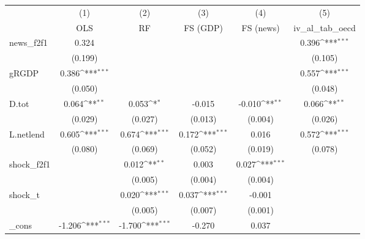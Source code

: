 {
\def\sym#1{\ifmmode^{#1}\else\(^{#1}\)\fi}
\begin{tabular}{l*{5}{c}}
\toprule
            &\multicolumn{1}{c}{(1)}&\multicolumn{1}{c}{(2)}&\multicolumn{1}{c}{(3)}&\multicolumn{1}{c}{(4)}&\multicolumn{1}{c}{(5)}\\
            &\multicolumn{1}{c}{OLS}&\multicolumn{1}{c}{RF}&\multicolumn{1}{c}{FS (GDP)}&\multicolumn{1}{c}{FS (news)}&\multicolumn{1}{c}{iv\_al\_tab\_oecd}\\
\midrule
news\_f2f1   &       0.324         &                     &                     &                     &       0.396\sym{***}\\
            &     (0.199)         &                     &                     &                     &     (0.105)         \\
\addlinespace
gRGDP       &       0.386\sym{***}&                     &                     &                     &       0.557\sym{***}\\
            &     (0.050)         &                     &                     &                     &     (0.048)         \\
\addlinespace
D.tot       &       0.064\sym{**} &       0.053\sym{*}  &      -0.015         &      -0.010\sym{**} &       0.066\sym{**} \\
            &     (0.029)         &     (0.027)         &     (0.013)         &     (0.004)         &     (0.026)         \\
\addlinespace
L.netlend   &       0.605\sym{***}&       0.674\sym{***}&       0.172\sym{***}&       0.016         &       0.572\sym{***}\\
            &     (0.080)         &     (0.069)         &     (0.052)         &     (0.019)         &     (0.078)         \\
\addlinespace
shock\_f2f1  &                     &       0.012\sym{**} &       0.003         &       0.027\sym{***}&                     \\
            &                     &     (0.005)         &     (0.004)         &     (0.004)         &                     \\
\addlinespace
shock\_t     &                     &       0.020\sym{***}&       0.037\sym{***}&      -0.001         &                     \\
            &                     &     (0.005)         &     (0.007)         &     (0.001)         &                     \\
\addlinespace
\_cons      &      -1.206\sym{***}&      -1.700\sym{***}&      -0.270         &       0.037         &                     \\

\end{tabular}}
